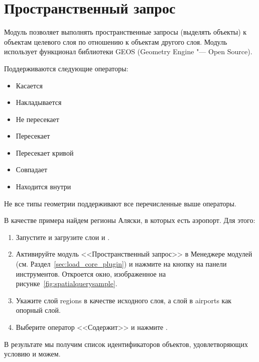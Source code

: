 
\section{Пространственный запрос}\label{sec:spatial_query}


Модуль  позволяет выполнять
пространственные запросы (выделять объекты) к объектам целевого слоя по
отношению к объектам другого слоя. Модуль использует функционал библиотеки
GEOS (Geometry Engine "--- Open Source).

Поддерживаются следующие операторы:

\begin{itemize}[label=--]
\item Касается
\item Накладывается
\item Не пересекает
\item Пересекает
\item Пересекает кривой
\item Совпадает
\item Находится внутри
\end{itemize}

Не все типы геометрии поддерживают все перечисленные выше операторы.


В качестве примера найдем регионы Аляски, в которых есть аэропорт. Для этого:

\begin{enumerate}
\item Запустите \qg и загрузите слои  и .
\item Активируйте модуль <<Пространственный запрос>> в Менеджере модулей
(см. Раздел~\ref{sec:load_core_plugin}) и нажмите на кнопку
 на панели инструментов.
Откроется окно, изображенное на рисунке~\ref{fig:spatialquerysample}.
\item Укажите слой regions в качестве исходного слоя, а слой в airports
как опорный слой.
\item Выберите оператор <<Содержит>> и нажмите .
\end{enumerate}

В результате мы получим список идентификаторов объектов, удовлетворяющих
условию и можем.

